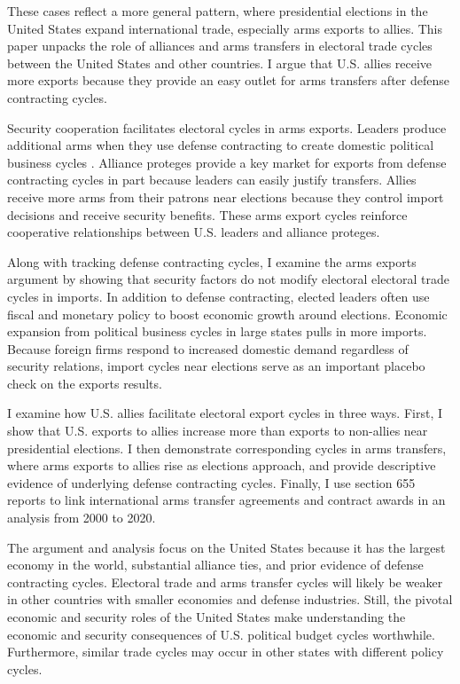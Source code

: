 \documentclass[12pt]{article}
\begin{document}
These cases reflect a more general pattern, where presidential elections in the United States expand international trade, especially arms exports to allies.
This paper unpacks the role of alliances and arms transfers in electoral trade cycles between the United States and other countries. 
I argue that U.S. allies receive more exports because they provide an easy outlet for arms transfers after defense contracting cycles. 


Security cooperation facilitates electoral cycles in arms exports. 
Leaders produce additional arms when they use defense contracting to create domestic political business cycles \citep{Tufte1978, Mintz1988, Mayer1995, DerouenHeo2000, Becker2021}.
Alliance proteges provide a key market for exports from defense contracting cycles in part because leaders can easily justify transfers.
Allies receive more arms from their patrons near elections because they control import decisions and receive security benefits. 
These arms export cycles reinforce cooperative relationships between U.S. leaders and alliance proteges.


Along with tracking defense contracting cycles, I examine the arms exports argument by showing that security factors do not modify electoral electoral trade cycles in imports.
In addition to defense contracting, elected leaders often use fiscal and monetary policy \citep{Nordhaus1975, Tufte1978, Rogoff1987, ClarkHallerberg2000} to boost economic growth around elections. 
Economic expansion from political business cycles in large states pulls in more imports.
Because foreign firms respond to increased domestic demand regardless of security relations, import cycles near elections serve as an important placebo check on the exports results.


I examine how U.S. allies facilitate electoral export cycles in three ways. 
First, I show that U.S. exports to allies increase more than exports to non-allies near presidential elections. 
I then demonstrate corresponding cycles in arms transfers, where arms exports to allies rise as elections approach, and provide descriptive evidence of underlying defense contracting cycles.
Finally, I use section 655 reports to link international arms transfer agreements and contract awards in an analysis from 2000 to 2020.


The argument and analysis focus on the United States because it has the largest economy in the world, substantial alliance ties, and prior evidence of defense contracting cycles. 
Electoral trade and arms transfer cycles will likely be weaker in other countries with smaller economies and defense industries. 
Still, the pivotal economic and security roles of the United States make understanding the economic and security consequences of U.S. political budget cycles worthwhile.
Furthermore, similar trade cycles may occur in other states with different policy cycles. 
\end{document}
